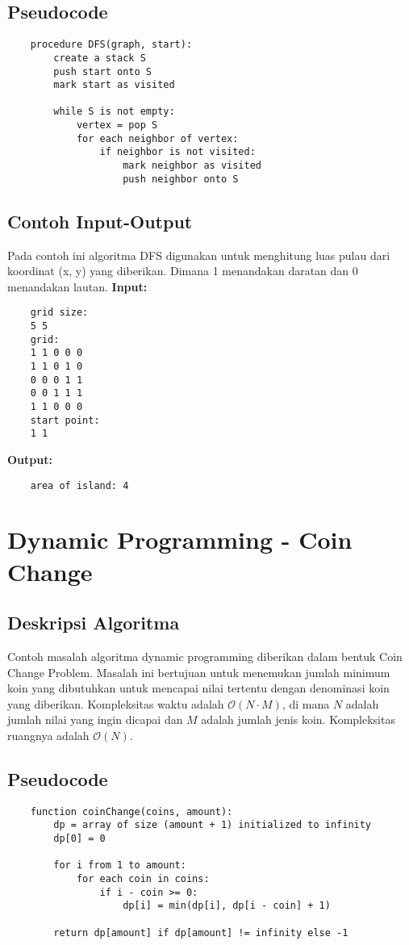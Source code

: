 \subsection{Pseudocode}
\begin{verbatim}
    procedure DFS(graph, start):
        create a stack S
        push start onto S
        mark start as visited

        while S is not empty:
            vertex = pop S
            for each neighbor of vertex:
                if neighbor is not visited:
                    mark neighbor as visited
                    push neighbor onto S
\end{verbatim}

\subsection{Contoh Input-Output}
Pada contoh ini algoritma DFS digunakan untuk menghitung luas pulau dari koordinat (x, y) yang diberikan. Dimana 1 menandakan daratan dan 0 menandakan lautan.
\textbf{Input:}
\begin{verbatim}
    grid size:
    5 5
    grid:
    1 1 0 0 0
    1 1 0 1 0
    0 0 0 1 1
    0 0 1 1 1
    1 1 0 0 0
    start point:
    1 1
\end{verbatim}

\textbf{Output:}
\begin{verbatim}
    area of island: 4
\end{verbatim}

\section{Dynamic Programming - Coin Change}
\label{sec:coin-change-implementation}

\subsection{Deskripsi Algoritma}
Contoh masalah algoritma dynamic programming diberikan dalam bentuk Coin Change Problem. Masalah ini bertujuan untuk menemukan jumlah minimum koin yang dibutuhkan untuk mencapai nilai tertentu dengan denominasi koin yang diberikan. Kompleksitas waktu adalah $\mathcal{O}\left(N \cdot M\right)$, di mana $N$ adalah jumlah nilai yang ingin dicapai dan $M$ adalah jumlah jenis koin. Kompleksitas ruangnya adalah $\mathcal{O}\left(N\right)$.


\subsection{Pseudocode}
\begin{verbatim}
    function coinChange(coins, amount):
        dp = array of size (amount + 1) initialized to infinity
        dp[0] = 0

        for i from 1 to amount:
            for each coin in coins:
                if i - coin >= 0:
                    dp[i] = min(dp[i], dp[i - coin] + 1)

        return dp[amount] if dp[amount] != infinity else -1
\end{verbatim}

